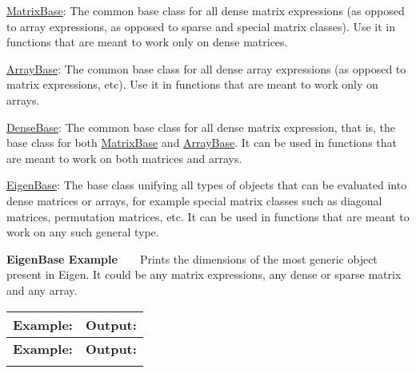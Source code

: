 \begin{DoxyItemize}
\item \hyperlink{group___core___module_class_eigen_1_1_matrix_base}{Matrix\+Base}\+: The common base class for all dense matrix expressions (as opposed to array expressions, as opposed to sparse and special matrix classes). Use it in functions that are meant to work only on dense matrices. \item \hyperlink{group___core___module_class_eigen_1_1_array_base}{Array\+Base}\+: The common base class for all dense array expressions (as opposed to matrix expressions, etc). Use it in functions that are meant to work only on arrays. \item \hyperlink{group___core___module_class_eigen_1_1_dense_base}{Dense\+Base}\+: The common base class for all dense matrix expression, that is, the base class for both {\ttfamily \hyperlink{group___core___module_class_eigen_1_1_matrix_base}{Matrix\+Base}} and {\ttfamily \hyperlink{group___core___module_class_eigen_1_1_array_base}{Array\+Base}}. It can be used in functions that are meant to work on both matrices and arrays. \item \hyperlink{group___core___module_struct_eigen_1_1_eigen_base}{Eigen\+Base}\+: The base class unifying all types of objects that can be evaluated into dense matrices or arrays, for example special matrix classes such as diagonal matrices, permutation matrices, etc. It can be used in functions that are meant to work on any such general type.\end{DoxyItemize}
{\bfseries  Eigen\+Base Example }~\newline
~\newline
 Prints the dimensions of the most generic object present in Eigen. It could be any matrix expressions, any dense or sparse matrix and any array. \tabulinesep=1mm
\begin{longtabu} spread 0pt [c]{*{2}{|X[-1]}|}
\hline
\rowcolor{\tableheadbgcolor}\textbf{ Example\+:}&\textbf{ Output\+: }\\
\endfirsthead
\hline
\endfoot
\hline
\rowcolor{\tableheadbgcolor}\textbf{ Example\+:}&\textbf{ Output\+: }\\
\endhead

\begin{DoxyCodeInclude}
\end{DoxyCodeInclude}
  &
\begin{DoxyVerbInclude}
\end{DoxyVerbInclude}
 \\
\end{longtabu}

